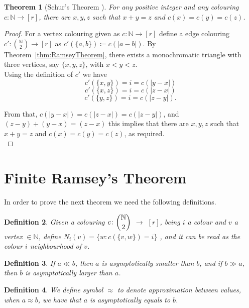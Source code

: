 \documentclass[12pt,twoside,a4paper,bibliography=totocnumbered]{book}
\numberwithin{equation}{section}
\newtheorem{theorem}             {Theorem}[section]
\newtheorem{definition}	[theorem] {Definition}
\theoremstyle{remark}
\begin{document}
\begin{theorem}[{Schur's Theorem \cite{Sc16}}]\label{thm:Schur'sTheorem} %
For any positive integer and any colouring $c\colon \mathbb{N} \rightarrow [r]$, there are $x,y,z$ such that $x+y=z$ and $c(x) = c(y) = c(z)$.
\end{theorem}
\begin{proof}
  For a vertex colouring  given as $c\colon \mathbb{N} \rightarrow [r]$ define a edge colouring $c'\colon \binom{\mathbb{N}}{2} \rightarrow [r]$ as $c'(\{a,b\}) \coloneqq c(|a-b|)$. By Theorem~\ref{thm:RamseyTheorem}, there exists a monochromatic triangle with three vertices, say $\{x,y,z\}$, with $x<y<z$.\\
Using the definition of $c'$  we have
$$c'(\{x,y\}) = i = c(|y-x|)$$
$$c'(\{x,z\})=  i = c(|z-x|)$$
$$c'(\{y,z\}) = i = c(|z-y|).$$

From that, $c(|y-x|) = c(|z-x|) = c(|z-y|)$, and $(z-y)+(y-x)=(z-x)$ this implies that there are $x,y,z$ such that $x+y=z$ and $c(x) = c(y) = c(z)$, as required.\\
\end{proof}

\section{Finite Ramsey's Theorem}
In order to prove the next theorem we need the following definitions.
\begin{definition}
Given a colouring $c\colon\dbinom{\mathbb{N}}{2}$ $\rightarrow$ $[r]$, being $i$ a colour and  $v$ a vertex $\in \mathbb{N}$, define $N_i(v) =\{ w: c(\{v,w\})=i\}$ , and it can be read as the colour $i$ neighbourhood of $v$.
\end{definition}

\begin{definition}
If $a \ll b$, then $a$ is asymptotically smaller than $b$, and if $b \gg a$, then $b$ is asymptotically larger than $a$.  
\end{definition}
\begin{definition}
We define symbol $\approx$ to denote approximation between values, when $ a \approx b$,  we have that $a$ is asymptotically equals to $b$.  
\end{definition}
\end{document}
